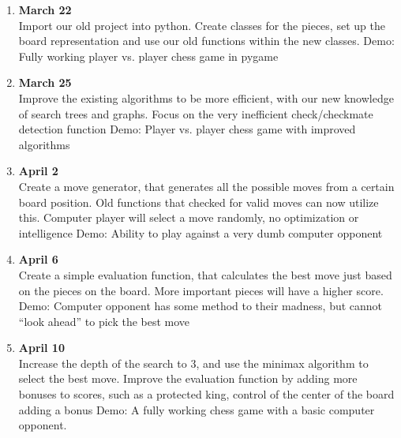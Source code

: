 \documentclass{article}
\begin{document}
  \begin{enumerate}
    \item \textbf{March 22}\\ Import our old project into python. Create classes
    for the pieces, set up the board representation and use our old functions
    within the new classes. Demo: Fully working player vs. player chess game in
    pygame

    \item \textbf{March 25}\\ Improve the existing algorithms to be more
    efficient, with our new knowledge of search trees and graphs. Focus on the
    very inefficient check/checkmate detection function Demo: Player vs. player
    chess game with improved algorithms
    \newpage
    \item \textbf{April 2}\\ Create a move generator, that generates all the
    possible moves from a certain board position. Old functions that checked for
    valid moves can now utilize this. Computer player will select a move
    randomly, no optimization or intelligence Demo: Ability to play against a
    very dumb computer opponent

    \item \textbf{April 6}\\ Create a simple evaluation function, that
    calculates the best move just based on the pieces on the board. More
    important pieces will have a higher score. Demo: Computer opponent has some
    method to their madness, but cannot “look ahead” to pick the best move

    \item \textbf{April 10}\\ Increase the depth of the search to 3, and use the
    minimax algorithm to select the best move. Improve the evaluation function
    by adding more bonuses to scores, such as a protected king, control of the
    center of the board adding a bonus Demo: A fully working chess game with a
    basic computer opponent.
\end{enumerate}
\end{document}
